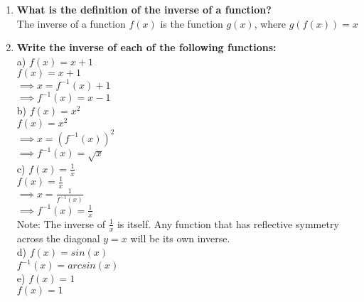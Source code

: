 \begin{enumerate}

\item{{\bf What is the definition of the inverse of a function?}\\
{The inverse of a function $f(x)$ is the function $g(x)$, where $g(f(x))=x$}\\}

\item{\bf Write the inverse of each of the following functions:}\\

\tab a) $f(x) = x + 1$\\

\tab \tab $f(x) = x + 1$\\

\tab \tab $\implies x = f^{-1}(x) + 1$\\

\tab \tab $\implies f^{-1}(x) = x - 1$\\

\tab b) $f(x) = x^2$\\

\tab \tab $f(x) = x^2$\\

\tab \tab $\implies x = (f^{-1}(x))^2$\\

\tab \tab $\implies f^{-1}(x) = \sqrt{x}$\\

\tab c) $f(x) = \frac{1}{x}$\\

\tab \tab $f(x) = \frac{1}{x}$\\

\tab \tab $\implies x = \frac{1}{f^{-1}(x)}$\\

\tab \tab $\implies f^{-1}(x) = \frac{1}{x}$\\

\tab \tab Note:  The inverse of $\frac{1}{x}$ is itself.  Any function that has reflective symmetry across the diagonal $y = x$ will be its own inverse.\\

\tab d) $f(x) = sin(x)$\\

\tab \tab $f^{-1}(x) = arcsin(x)$\\

\tab e) $f(x) = 1$\\

\tab \tab $f(x) = 1$\\


\end{enumerate}
